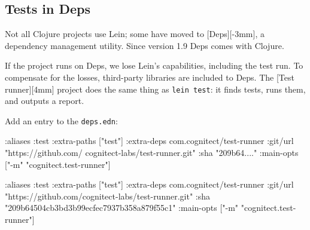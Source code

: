 \begin{english}
\end{english}

\subsection{Tests in Deps}


Not all Clojure projects use Lein; some have moved to [Deps][-3mm], a dependency management utility. Since version 1.9 Deps comes with Clojure.


If the project runs on Deps, we lose Lein's capabilities, including the test run. To compensate for the losses, third-party libraries are included to Deps. The [Test runner][4mm] project does the same thing as \verb|lein test|: it finds tests, runs them, and outputs a report.

Add an entry to the \verb|deps.edn|:

\ifnarrow

\begin{english}
  \begin{clojure}
:aliases
{:test
 {:extra-paths ["test"]
  :extra-deps
  {com.cognitect/test-runner
   {:git/url
    "https://github.com/
         cognitect-labs/test-runner.git"
    :sha "209b64...."}}
  :main-opts
  ["-m" "cognitect.test-runner"]}}
  \end{clojure}
\end{english}

\else

\begin{english}
  \begin{clojure}
:aliases
{:test
 {:extra-paths ["test"]
  :extra-deps
  {com.cognitect/test-runner
   {:git/url "https://github.com/cognitect-labs/test-runner.git"
    :sha "209b64504cb3bd3b99ecfec7937b358a879f55c1"}}
  :main-opts ["-m" "cognitect.test-runner"]}}
  \end{clojure}
\end{english}

\fi


